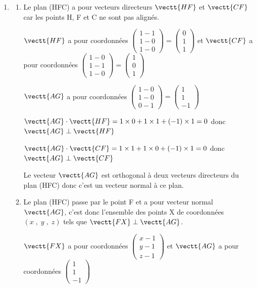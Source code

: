 \begin{enumerate}
\item 
	\begin{enumerate}
		\item %
Le plan (HFC) a pour vecteurs directeurs $\vectt{HF}$ et $\vectt{CF}$ car les points H, F et C ne sont pas alignés.		

$\vectt{HF}$ a pour coordonnées
$\begin{pmatrix}
1-1\\1-0\\1-0
\end{pmatrix}
=
\begin{pmatrix}
0\\1\\1
\end{pmatrix}$
et
$\vectt{CF}$ a pour coordonnées
$\begin{pmatrix}
1-0\\1-1\\1-0
\end{pmatrix}
=
\begin{pmatrix}
1\\0\\1
\end{pmatrix}$
		
$\vectt{AG}$ a pour coordonnées
$\begin{pmatrix}
1-0\\1-0\\0-1
\end{pmatrix}
=
\begin{pmatrix}
1\\1\\-1
\end{pmatrix}$		
	
$\vectt{AG}\cdot\vectt{HF}=1\times 0 + 1\times 1 + (-1)\times 1 = 0$
donc $\vectt{AG}\perp\vectt{HF}$
		
$\vectt{AG}\cdot\vectt{CF}=1\times 1 + 1\times 0 + (-1)\times 1 = 0$
donc $\vectt{AG}\perp\vectt{CF}$		

Le vecteur $\vectt{AG}$ est orthogonal à deux vecteurs directeurs du plan (HFC) donc c'est un vecteur normal à ce plan.
		
		\item %
Le plan (HFC) passe par le point F et a pour vecteur normal $\vectt{AG}$, c'est donc l'ensemble des points X de coordonnées $(x\;,\;y\;,\;z)$ tels que 
$\vectt{FX}\perp\vectt{AG}$.		
		
$\vectt{FX}$ a pour coordonnées
$\begin{pmatrix}
x-1\\y-1\\z-1
\end{pmatrix}$
et $\vectt{AG}$ a pour coordonnées
$\begin{pmatrix}
1\\1\\-1
\end{pmatrix}$


\end{enumerate}
\end{enumerate}
